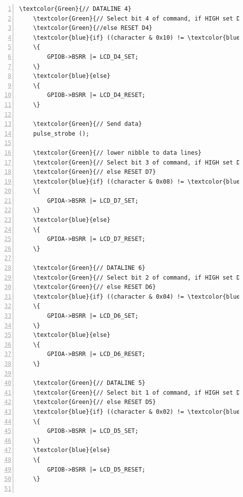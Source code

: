 \begin{Verbatim}[fontfamily=courier,fontsize=\small, numbers=left,commandchars=\\\{\}]
	\textcolor{Green}{// DATALINE 4}
	\textcolor{Green}{// Select bit 4 of command, if HIGH set Data line 4 (D4)} 
	\textcolor{Green}{//else RESET D4}
	\textcolor{blue}{if} ((character & 0x10) != \textcolor{blue}{0})		          
	\{
		GPIOB->BSRR |= LCD_D4_SET;
	\}
	\textcolor{blue}{else}
	\{
		GPIOB->BSRR |= LCD_D4_RESET;
	\}

	\textcolor{Green}{// Send data}
	pulse_strobe ();					   

	\textcolor{Green}{// lower nibble to data lines}
	\textcolor{Green}{// Select bit 3 of command, if HIGH set Data line 7 (D7)}
	\textcolor{Green}{// else RESET D7}
	\textcolor{blue}{if} ((character & 0x08) != \textcolor{blue}{0}) 			   
	\{
		GPIOA->BSRR |= LCD_D7_SET;
	\}
	\textcolor{blue}{else}
	\{
		GPIOA->BSRR |= LCD_D7_RESET;
	\}
       
	\textcolor{Green}{// DATALINE 6}
	\textcolor{Green}{// Select bit 2 of command, if HIGH set Data line 6 (D6)}
	\textcolor{Green}{// else RESET D6}
	\textcolor{blue}{if} ((character & 0x04) != \textcolor{blue}{0})			
	\{
		GPIOA->BSRR |= LCD_D6_SET;
	\}
	\textcolor{blue}{else}
	\{
		GPIOA->BSRR |= LCD_D6_RESET;
	\}

	\textcolor{Green}{// DATALINE 5}
	\textcolor{Green}{// Select bit 1 of command, if HIGH set Data line 5 (D5)}
	\textcolor{Green}{// else RESET D5}
	\textcolor{blue}{if} ((character & 0x02) != \textcolor{blue}{0})
	\{
		GPIOB->BSRR |= LCD_D5_SET;                 
	\}
	\textcolor{blue}{else}
	\{
		GPIOB->BSRR |= LCD_D5_RESET;
	\}
        

\end{Verbatim}
